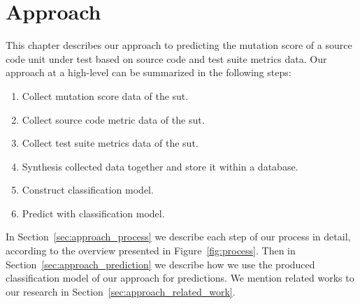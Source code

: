\chapter{Approach}
\label{chap:approach}
This chapter describes our approach to predicting the mutation score of a source code unit under test based on source code and test suite metrics data. Our approach at a high-level can be summarized in the following steps:

\begin{enumerate}
  \item Collect mutation score data of the \gls{sut}.
  \item Collect source code metric data of the \gls{sut}.
  \item Collect test suite metrics data of the \gls{sut}.
  \item Synthesis collected data together and store it within a database.
  \item Construct classification model.
  \item Predict with classification model.
\end{enumerate}

In Section~\ref{sec:approach_process} we describe each step of our process in detail, according to the overview presented in Figure~\ref{fig:process}. Then in Section~\ref{sec:approach_prediction} we describe how we use the produced classification model of our approach for predictions. We mention related works to our research in Section~\ref{sec:approach_related_work}.

